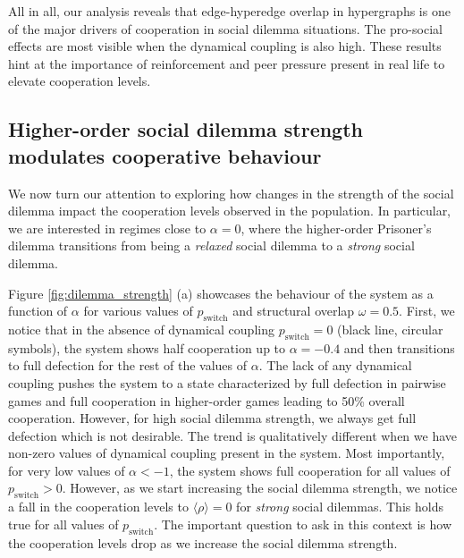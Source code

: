 \documentclass[a4paper,pre,reqno,superscriptaddress,twocolumn, floatfix]{revtex4}
\begin{document}
All in all, our analysis reveals that edge-hyperedge overlap in hypergraphs is one of the major drivers of cooperation in social dilemma situations. The pro-social effects are most visible when the dynamical coupling is also high. These results hint at the importance of reinforcement and peer pressure present in real life to elevate cooperation levels.





\subsection{Higher-order social dilemma strength modulates cooperative behaviour}


We now turn our attention to exploring how changes in the strength of the social dilemma impact the cooperation levels observed in the population. In particular, we are interested in regimes close to $\alpha = 0$, where the higher-order Prisoner's dilemma transitions from being a \textit{relaxed} social dilemma to a \textit{strong} social dilemma.


Figure \eqref{fig:dilemma_strength} (a) showcases the behaviour of the system as a function of $\alpha$ for various values of $p_{\text{switch}}$ and structural overlap $\omega=0.5$. First, we notice that in the absence of dynamical coupling $p_{\text{switch}}=0$ (black line, circular symbols), the system shows half cooperation up to $\alpha=-0.4$ and then transitions to full defection for the rest of the values of $\alpha$. The lack of any dynamical coupling pushes the system to a state characterized by full defection in pairwise games and full cooperation in higher-order games leading to 50\% overall cooperation. However, for high social dilemma strength, we always get full defection which is not desirable. The trend is qualitatively different when we have non-zero values of dynamical coupling present in the system. Most importantly, for very low values of $\alpha < -1$, the system shows full cooperation for all values of $p_{\text{switch}}>0$. However, as we start increasing the social dilemma strength, we notice a fall in the cooperation levels to $\langle \rho \rangle = 0$ for \textit{strong} social dilemmas. This holds true for all values of $p_{\text{switch}}$. The important question to ask in this context is how the cooperation levels drop as we increase the social dilemma strength.
\end{document}
